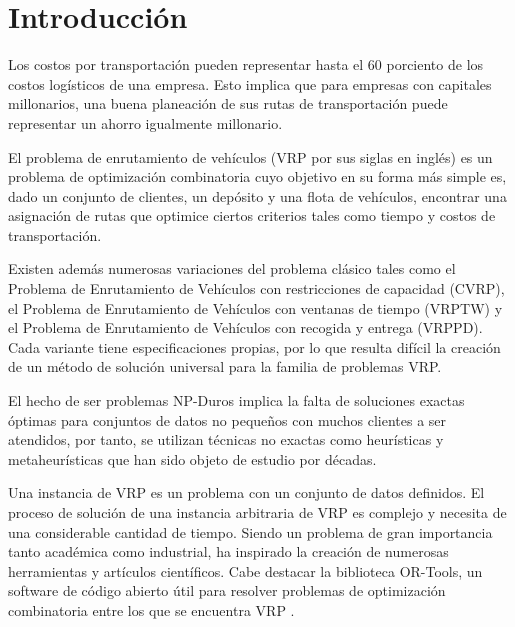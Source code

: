 \chapter*{Introducción}\label{chapter:introduction}

\qquad 
Los costos por transportación pueden representar hasta el 60 porciento de los costos logísticos de una empresa. Esto implica que para empresas con capitales millonarios, una buena planeación de sus rutas de transportación puede representar un ahorro igualmente millonario.

El problema de enrutamiento de vehículos (VRP por sus siglas en inglés) es un problema de optimización combinatoria cuyo objetivo en su forma más simple es, dado un conjunto de clientes, un depósito y una flota de vehículos, encontrar una asignación de rutas que optimice ciertos criterios tales como tiempo y costos de transportación.

Existen además numerosas variaciones del problema clásico tales como el Problema de Enrutamiento de Vehículos con restricciones de capacidad (CVRP)\cite{TODO}, el Problema de Enrutamiento de Vehículos con ventanas de tiempo (VRPTW)\cite{TODO} y el Problema de Enrutamiento de Vehículos con recogida y entrega (VRPPD)\cite{TODO}. Cada variante tiene especificaciones propias, por lo que resulta difícil la creación de un método de solución universal para la familia de problemas VRP.

El hecho de ser problemas NP-Duros\cite{TODO} implica la falta de soluciones exactas óptimas para conjuntos de datos no pequeños con muchos clientes a ser atendidos, por tanto, se utilizan técnicas no exactas como heurísticas y metaheurísticas que han sido objeto de estudio por décadas\cite{TODO}.

Una instancia de VRP es un problema con un conjunto de datos definidos. El proceso de solución de una instancia arbitraria de VRP es complejo y necesita de una considerable cantidad de tiempo. Siendo un problema de gran importancia tanto académica como industrial, ha inspirado la creación de numerosas herramientas y artículos científicos. Cabe destacar la biblioteca OR-Tools, un software de código abierto útil para resolver problemas de optimización combinatoria entre los que se encuentra VRP \cite{TODO}.

